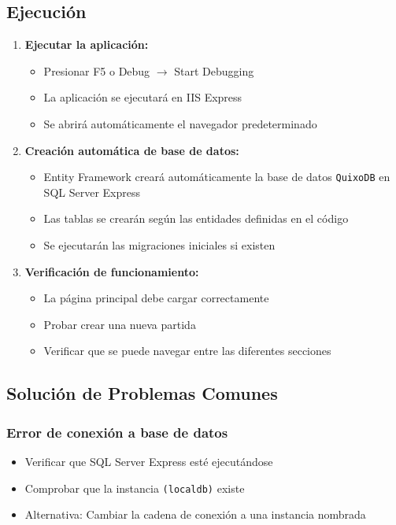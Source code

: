 \documentclass[12pt]{article}
\begin{document}
\subsection*{Ejecución}
\begin{enumerate}
    \item \textbf{Ejecutar la aplicación:}
    \begin{itemize}
        \item Presionar F5 o Debug $\rightarrow$ Start Debugging
        \item La aplicación se ejecutará en IIS Express
        \item Se abrirá automáticamente el navegador predeterminado
    \end{itemize}

    \item \textbf{Creación automática de base de datos:}
    \begin{itemize}
        \item Entity Framework creará automáticamente la base de datos \texttt{QuixoDB} en SQL Server Express
        \item Las tablas se crearán según las entidades definidas en el código
        \item Se ejecutarán las migraciones iniciales si existen
    \end{itemize}

    \item \textbf{Verificación de funcionamiento:}
    \begin{itemize}
        \item La página principal debe cargar correctamente
        \item Probar crear una nueva partida
        \item Verificar que se puede navegar entre las diferentes secciones
    \end{itemize}
\end{enumerate}

\subsection*{Solución de Problemas Comunes}

\subsubsection*{Error de conexión a base de datos}
\begin{itemize}
    \item Verificar que SQL Server Express esté ejecutándose
    \item Comprobar que la instancia \texttt{(localdb)\MSSQLLocalDB} existe
    \item Alternativa: Cambiar la cadena de conexión a una instancia nombrada
\end{itemize}
\end{document}
